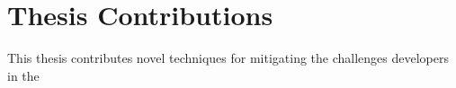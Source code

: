 \section{Thesis Contributions}
\label{sec:intro:contribution}
This thesis contributes novel techniques for mitigating the challenges  developers in the 
